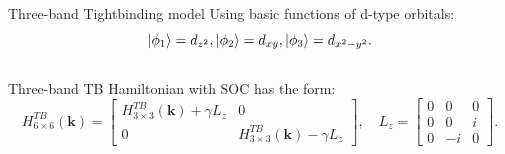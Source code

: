 \documentclass{beamer}
\begin{document}
\begin{frame}{Three-band Tightbinding model}
	Using basic functions of d-type orbitals: $$\ket{\phi_1} = d_{z^2}, \ket{\phi_2} = d_{xy}, \ket{\phi_3} = d_{x^2- y^2}.$$\\Three-band TB Hamiltonian with SOC has the form:
	\begin{equation*}
		H^{TB}_{6\times 6}(\textbf{k}) = \begin{bmatrix}
			H^{TB}_{3\times 3}(\textbf{k}) + \gamma L_z & 0\\ 0& H^{TB}_{3\times 3}(\textbf{k}) - \gamma L_z
		\end{bmatrix}, \quad L_z= \begin{bmatrix}
			0 & 0 & 0\\
			0 & 0 & i\\
			0 & -i& 0
		\end{bmatrix}.
	\end{equation*}
\end{frame}
\end{document}
